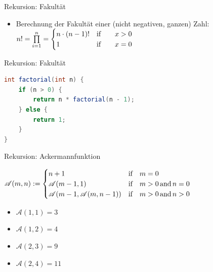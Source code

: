 \documentclass[18pt]{beamer}
\begin{document}
\begin{frame}{Rekursion: Fakultät}
    \begin{exampleblock}{}
        \begin{itemize}
            \item Berechnung der Fakultät einer (nicht negativen, ganzen) Zahl:\\
            \vspace{.2in}
            $
            n! = \prod\limits_{i=1}^{n} =
                \begin{cases}
                    n \cdot (n-1)! & \text{if\qquad} x > 0 \\
                    1 & \text{if\qquad} x = 0
                \end{cases}
            $
        \end{itemize}
    \end{exampleblock}
\end{frame}

\begin{frame}[fragile]{Rekursion: Fakultät}
    \begin{exampleblock}{}
        \begin{lstlisting}[language=Java,basicstyle=\scriptsize]
int factorial(int n) {
    if (n > 0) {
        return n * factorial(n - 1);
    } else {
        return 1;
    }
}
        \end{lstlisting}

    \end{exampleblock}

\end{frame}

\begin{frame}[fragile]{Rekursion: Ackermannfunktion}
    \begin{exampleblock}{}
        $
        \mathscr{A}(m, n) :=
        \begin{cases}
            n+1 & \text{if\quad} m = 0\\
            \mathscr{A}(m-1, 1) & \text{if\quad} m > 0 \text{\,and\,} n = 0\\
            \mathscr{A}(m-1, \mathscr{A}(m, n-1)) & \text{if\quad} m > 0 \text{\,and\,} n > 0
        \end{cases}
        $
    \end{exampleblock}
    \pause
    \begin{itemize}
        \item $\mathscr{A}(1, 1) = 3$
        \item $\mathscr{A}(1, 2) = 4$
        \item $\mathscr{A}(2, 3) = 9$
        \item $\mathscr{A}(2, 4) = 11$
    \end{itemize}
\end{frame}
\end{document}
